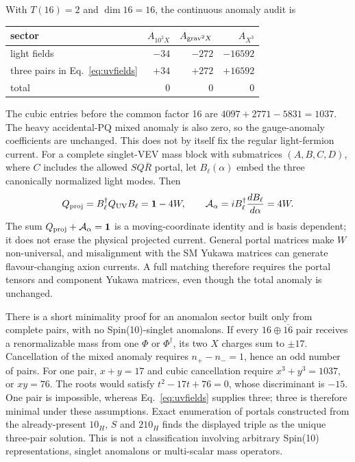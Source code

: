 \documentclass[11pt,a4paper]{article}
\begin{document}
With $T(16)=2$ and $\dim16=16$, the continuous anomaly audit is
\begin{center}
\begin{tabular}{lrrr}
\toprule
sector & $A_{10^2X}$ & $A_{{\rm grav}^2X}$ & $A_{X^3}$\\
\midrule
light fields & $-34$ & $-272$ & $-16592$\\
three pairs in Eq.~\eqref{eq:uvfields} & $+34$ & $+272$ & $+16592$\\
\midrule
total & $0$ & $0$ & $0$\\
\bottomrule
\end{tabular}
\end{center}
The cubic entries before the common factor 16 are
$4097+2771-5831=1037$. The heavy accidental-PQ mixed anomaly is also zero,
so the gauge-anomaly coefficients are unchanged. This does not by itself
fix the regular light-fermion current. For a complete singlet-VEV mass block
with submatrices $(A,B,C,D)$, where $C$ includes the allowed $SQ\overline R$
portal, let $B_\ell(\alpha)$ embed the three canonically normalized light
modes. Then
\begin{equation}
 Q_{\rm proj}=B_\ell^\dagger Q_{\rm UV}B_\ell
 =\mathbf1-4W,\qquad
 {\cal A}_\alpha=iB_\ell^\dagger\frac{dB_\ell}{d\alpha}=4W.
\label{eq:portalcurrent}
\end{equation}
The sum $Q_{\rm proj}+{\cal A}_\alpha=\mathbf1$ is a moving-coordinate
identity and is basis dependent; it does not erase the physical projected
current. General portal matrices make $W$ non-universal, and misalignment
with the SM Yukawa matrices can generate flavour-changing axion currents.
A full matching therefore requires the portal tensors and component Yukawa
matrices, even though the total anomaly is unchanged.

There is a short minimality proof for an anomalon sector built only from
complete pairs, with no Spin(10)-singlet anomalons. If every
$16\oplus\overline{16}$ pair receives a renormalizable mass from one
$\Phi$ or $\Phi^\dagger$, its two $X$ charges sum to $\pm17$. Cancellation
of the mixed anomaly requires $n_+-n_-=1$, hence an odd number of pairs.
For one pair, $x+y=17$ and cubic cancellation require
$x^3+y^3=1037$, or $xy=76$. The roots would satisfy
$t^2-17t+76=0$, whose discriminant is $-15$. One pair is impossible,
whereas Eq.~\eqref{eq:uvfields} supplies three; three is therefore minimal
under these assumptions. Exact enumeration of portals constructed from
the already-present $10_H$, $S$ and $210_H$ finds the displayed triple as
the unique three-pair solution. This is not a classification involving
arbitrary Spin(10) representations, singlet anomalons or multi-scalar mass
operators.
\end{document}
